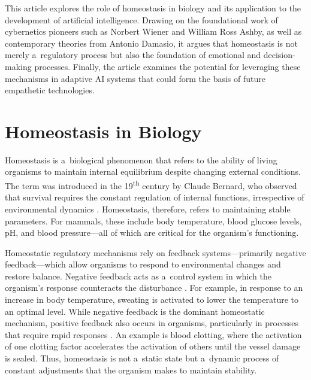 \documentclass[%
  manuscript=article,
  year=2024,
  volume=77,
  doi=00000.000,
]{zfn}
\begin{document}
This article explores the role of homeostasis in biology and its application to the development of artificial intelligence. Drawing on the foundational work of cybernetics pioneers such as Norbert Wiener and William Ross Ashby, as well as contemporary theories from Antonio Damasio, it argues that homeostasis is not merely a~regulatory process but also the foundation of emotional and decision-making processes. Finally, the article examines the potential for leveraging these mechanisms in adaptive AI systems that could form the basis of future empathetic technologies.



\section*{Homeostasis in Biology}

Homeostasis is a~biological phenomenon that refers to the ability of living organisms to maintain internal equilibrium despite changing external conditions. The term was introduced in the 19\textsuperscript{th} century by Claude Bernard, who observed that survival requires the constant regulation of internal functions, irrespective of environmental dynamics 
\parencite[][]{fleming_walter_1984}. %
 Homeostasis, therefore, refers to maintaining stable parameters. For mammals, these include body temperature, blood glucose levels, pH, and blood pressure---all of which are critical for the organism's functioning.



Homeostatic regulatory mechanisms rely on feedback systems---primarily negative feedback---which allow organisms to respond to environmental changes and restore balance. Negative feedback acts as a~control system in which the organism's response counteracts the disturbance 
\parencites[][]{perrimon_negative_1999}[][]{bielecki_cybernetic_2016}[][]{hancock_interplay_2017}. %
 For example, in response to an increase in body temperature, sweating is activated to lower the temperature to an optimal level. While negative feedback is the dominant homeostatic mechanism, positive feedback also occurs in organisms, particularly in processes that require rapid responses 
\parencite[][]{peters_principle_2007}. %
 An example is blood clotting, where the activation of one clotting factor accelerates the activation of others until the vessel damage is sealed. Thus, homeostasis is not a~static state but a~dynamic process of constant adjustments that the organism makes to maintain stability.
\end{document}
